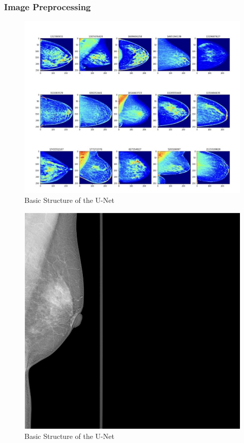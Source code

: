 \documentclass{article}
\begin{document}
\subsubsection{Image Preprocessing}
\begin{figure}[htp]
    \centering
    \includegraphics[scale = 0.8]{Figures/Pre-processed-data.png}
   \caption{Basic Structure of the U-Net}
\end{figure}
\begin{figure}[htp]
    \centering
    \includegraphics[scale = 0.5]{Figures/Bounding-Box.png}
   \caption{Basic Structure of the U-Net}
\end{figure}
\end{document}
